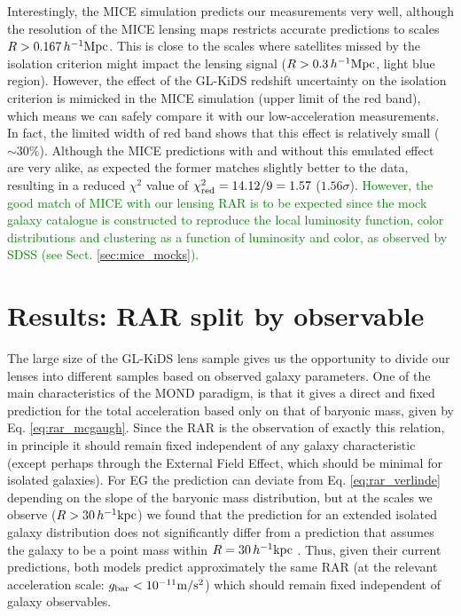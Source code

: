 \documentclass[usenatbib]{mnras}
\newcommand{\hkpc}{\, h^{-1}{\rm{kpc}} }
\newcommand{\hMpc}{\, h^{-1}{\rm{Mpc}} }
\newcommand{\mpss}{ {\rm m/s^2} }
\newcommand{\un}[1]{_{\rm #1}}
\begin{document}
Interestingly, the MICE simulation predicts our measurements very well, although the resolution of the MICE lensing maps restricts accurate predictions to scales $R > 0.167 \hMpc$. This is close to the scales where satellites missed by the isolation criterion might impact the lensing signal ($R > 0.3 \hMpc$, light blue region). However, the effect of the GL-KiDS redshift uncertainty on the isolation criterion is mimicked in the MICE simulation (upper limit of the red band), which means we can safely compare it with our low-acceleration measurements. In fact, the limited width of red band shows that this effect is relatively small ($\sim 30\%$). Although the MICE predictions with and without this emulated effect are very alike, as expected the former matches slightly better to the data, resulting in a reduced $\chi^2$ value of $\chi\un{red}^2 = 14.12 / 9 = 1.57$ ($1.56 \sigma$). \textcolor{Green}{However, the good match of MICE with our lensing RAR is to be expected since the mock galaxy catalogue is constructed to reproduce the local luminosity function, color distributions and clustering as a function of luminosity and color, as observed by SDSS (see Sect. \ref{sec:mice_mocks}).}

\section{Results: RAR split by observable}
\label{sec:results-observables}

The large size of the GL-KiDS lens sample gives us the opportunity to divide our lenses into different samples based on observed galaxy parameters. One of the main characteristics of the MOND paradigm, is that it gives a direct and fixed prediction for the total acceleration based only on that of baryonic mass, given by Eq. \ref{eq:rar_mcgaugh}. Since the RAR is the observation of exactly this relation, in principle it should remain fixed independent of any galaxy characteristic (except perhaps through the External Field Effect, which should be minimal for isolated galaxies). For EG the prediction can deviate from Eq. \ref{eq:rar_verlinde} depending on the slope of the baryonic mass distribution, but at the scales we observe ($R>30\hkpc$) we found that the prediction for an extended isolated galaxy distribution does not significantly differ from a prediction that assumes the galaxy to be a point mass within $R=30\hkpc$ \cite[see Sect. 4.3 of][]{brouwer2017}. Thus, given their current predictions, both models predict approximately the same RAR (at the relevant acceleration scale: $g\un{bar}<10^{-11} \mpss$) which should remain fixed independent of galaxy observables.
\end{document}
